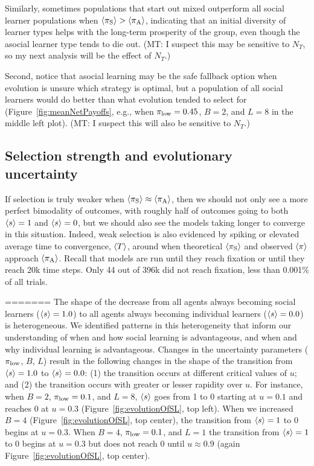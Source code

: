 \documentclass[letterpaper,11.5pt]{scrartcl}
\newcommand{\mt}[1]{{\textcolor{myorange} {({\tiny MT:} #1)}}}
\begin{document}
Similarly, sometimes populations that start out mixed outperform all
social learner populations when $\langle \pi_\mathrm{S} \rangle > \langle \pi_\mathrm{A} \rangle$, indicating that an initial
diversity of learner types helps with the long-term prosperity of the group, even
though the asocial learner type tends to die out. \mt{I suspect
this may be sensitive to $N_T$, so my next analysis will be the effect
of $N_T$.}

Second, notice that asocial learning may be the safe fallback option when 
evolution is unsure which strategy is optimal, 
but a population of all social learners would do better
than what evolution tended to select for (Figure~\ref{fig:meanNetPayoffs},
e.g., when $\pi_{\mathrm{low}}=0.45$, $B=2$, and $L=8$ in the middle left plot). \mt{I suspect
this will also be sensitive to $N_T$.} 


\subsection{Selection strength and evolutionary uncertainty}

If selection is truly weaker when $\langle \pi_\mathrm{S} \rangle \approx \langle \pi_\mathrm{A} \rangle$, then we should not
only see a more perfect bimodality of outcomes, with roughly half of outcomes going
to both $\langle s \rangle = 1$ and $\langle s \rangle = 0$, but we should also see the models taking
longer to converge in this situation.  Indeed, weak selection is also evidenced by
spiking or elevated average time to convergence, $\langle T \rangle$, around when theoretical
$\langle \pi_\mathrm{S} \rangle$ and observed $\langle \pi \rangle$ approach $\langle \pi_\mathrm{A} \rangle$. Recall that models are run
until they reach fixation or until they reach 20k time steps. Only 44 out of 396k
did not reach fixation, less than 0.001\% of all trials.






=======
The shape of the decrease from all agents
always becoming social learners ($\langle s \rangle = 1.0$) to 
all agents always becoming individual learners ($\langle s \rangle = 0.0$)
is heterogeneous. We identified patterns in this heterogeneity that inform our
understanding of when and how social learning is advantageous, and when 
and why individual learning is advantageous. 
Changes in the uncertainty parameters ($\pi_{\mathrm{low}}$, $B$, $L$) 
result in the following changes in the shape of the transition from $\langle s \rangle = 1.0$ 
to $\langle s \rangle = 0.0$: (1) the transition
occurs at different critical values of $u$; and (2) the transition occurs
with greater or lesser rapidity over $u$. 
For instance, when $B=2$, $\pi_{\mathrm{low}} = 0.1$, and $L=8$, $\langle s \rangle$ goes from 1 to 
0 starting at $u=0.1$ and reaches 0 at $u=0.3$ (Figure~\ref{fig:evolutionOfSL},
top left). When we increased $B=4$ (Figure~\ref{fig:evolutionOfSL}, top center), the
transition from $\langle s \rangle = 1$ to 0 begins at $u=0.3$. When $B=4$, $\pi_{\mathrm{low}}=0.1$,
and $L=1$ the transition from $\langle s \rangle=1$ to 0 begins at $u=0.3$ but does not
reach 0 until $u \approx 0.9$ (again Figure~\ref{fig:evolutionOfSL}, top center).
\end{document}
